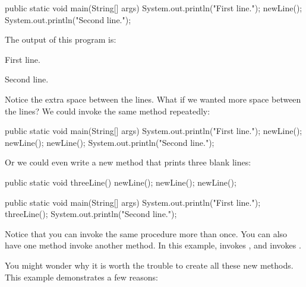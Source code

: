 \begin{code}
    public static void main(String[] args) {
        System.out.println("First line.");
        newLine();
        System.out.println("Second line.");
    }
\end{code}

The output of this program is:

\begin{stdout}
First line.

Second line.
\end{stdout}

Notice the extra space between the lines.
What if we wanted more space between the lines?
We could invoke the same method repeatedly:

\begin{code}
    public static void main(String[] args) {
        System.out.println("First line.");
        newLine();
        newLine();
        newLine();
        System.out.println("Second line.");
    }
\end{code}

Or we could even write a new method that prints three blank lines:

\begin{code}
    public static void threeLine() {
        newLine();
        newLine();
        newLine();
    }

    public static void main(String[] args) {
        System.out.println("First line.");
        threeLine();
        System.out.println("Second line.");
    }
\end{code}

Notice that you can invoke the same procedure more than once.
You can also have one method invoke another method.
In this example,  invokes , and  invokes .


You might wonder why it is worth the trouble to create all these new methods.
This example demonstrates a few reasons:

